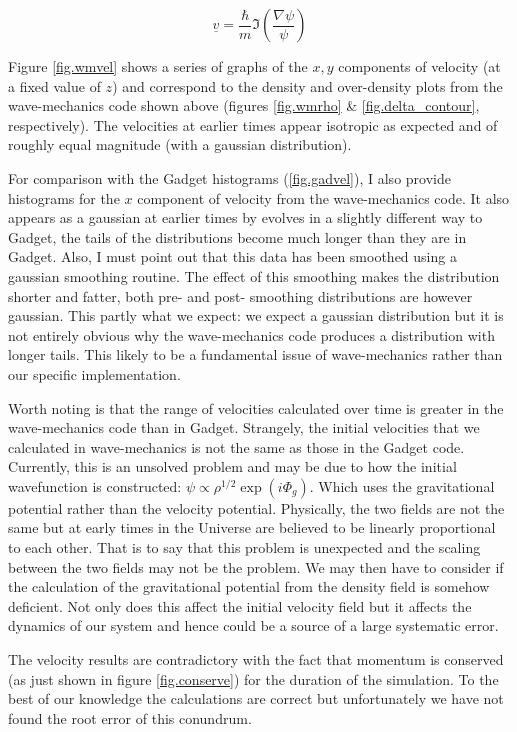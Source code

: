 \begin{equation}
\underline{v} = \frac{\hbar}{m} \Im\left(\frac{\nabla \psi}{\psi}\right)
\end{equation}

Figure \ref{fig.wmvel} shows a series of graphs of the $x,y$ components of velocity (at a fixed value of $z$) and correspond to the density and over-density plots from the wave-mechanics code shown above (figures \ref{fig.wmrho} \& \ref{fig.delta_contour}, respectively). The velocities at earlier times appear isotropic as expected and of roughly equal magnitude (with a gaussian distribution).

For comparison with the Gadget histograms (\ref{fig.gadvel}), I also provide histograms for the $x$ component of velocity from the wave-mechanics code. It also appears as a gaussian at earlier times by evolves in a slightly different way to Gadget, the tails of the distributions become much longer than they are in Gadget. Also, I must point out that this data has been smoothed using a gaussian smoothing routine. The effect of this smoothing makes the distribution shorter and fatter, both pre- and post- smoothing distributions are however gaussian. This partly what we expect: we expect a gaussian distribution but it is not entirely obvious why the wave-mechanics code produces a distribution with longer tails. This likely to be a fundamental issue of wave-mechanics rather than our specific implementation.

Worth noting is that the range of velocities calculated over time is greater in the wave-mechanics code than in Gadget. Strangely, the initial velocities that we calculated in wave-mechanics is not the same as those in the Gadget code. Currently, this is an unsolved problem and may be due to how the initial wavefunction is constructed: $\psi \propto \rho^{1/2} \exp(i\Phi_g)$. Which uses the gravitational potential rather than the velocity potential. Physically, the two fields are not the same but at early times in the Universe are believed to be linearly proportional to each other. That is to say that this problem is unexpected and the scaling between the two fields may not be the problem. We may then have to consider if the calculation of the gravitational potential from the density field is somehow deficient. Not only does this affect the initial velocity field but it affects the dynamics of our system and hence could be a source of a large systematic error.

The velocity results are contradictory with the fact that momentum is conserved (as just shown in figure \ref{fig.conserve}) for the duration of the simulation. To the best of our knowledge the calculations are correct but unfortunately we have not found the root error of this conundrum.

